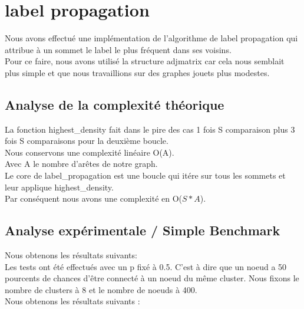 \documentclass[a4paper,10pt]{report}
\begin{document}
\section{label propagation}
Nous avons effectué une implémentation de l'algorithme de label propagation qui attribue à un sommet le label le plus fréquent dans ses voisins.
\\
Pour ce faire, nous avons utilisé la structure adjmatrix car cela nous semblait plus simple et que nous travaillions sur des graphes jouets plus modestes.
\subsection{Analyse de la complexité théorique}
La fonction highest\_density fait dans le pire des cas 1 fois S comparaison plus 3 fois S comparaisons pour la deuxième boucle. 
\\
Nous conservons une complexité linéaire O(A).
\\
Avec A le nombre d'arêtes de notre graph.
\\
Le core de label\_propagation est une boucle qui itére sur tous les sommets et leur applique highest\_density.
\\
Par conséquent nous avons une complexité en O($S*A$).

\subsection{Analyse expérimentale / Simple Benchmark}
Nous obtenons les résultats suivants:
\\
Les tests ont été effectués avec un p fixé à 0.5. C'est à dire que un noeud a 50 pourcents de chances d'être connecté à un noeud du même cluster. 
Nous fixons le nombre de clusters à 8 et le nombre de noeuds à 400.
\\
Nous obtenons les résultats suivants :\\
\end{document}
